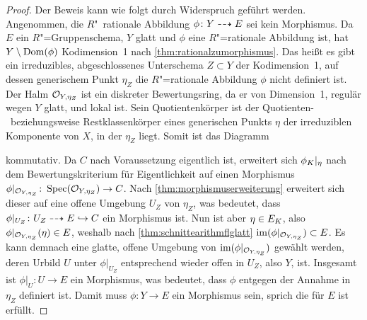 \begin{Satz}
\begin{proof}
    Der Beweis kann wie folgt durch Widerspruch geführt werden.
    Angenommen, die $R$"~ra\-tio\-na\-le Abbildung
    ${\phi\colon Y\dashrightarrow E}$ sei kein Morphismus. 
    Da $E$ ein $R$"=Gruppenschema, $Y$ glatt und $\phi$ eine
    $R$"=rationale Abbildung ist, hat $Y\setminus\operatorname{Dom}(\phi)$
    Kodimension~1 nach \ref{thm:rationalzumorphismus}.
    Das heißt es gibt ein irreduzibles, abgeschlossenes Unterschema
    $Z\subset Y$ der Kodimension~1, auf dessen generischem Punkt
    $\eta_Z$ die $R$"=rationale Abbildung $\phi$ nicht definiert ist.
    Der Halm $\mathcal{O}_{Y,\eta_Z}$ ist ein diskreter Bewertungsring, da er
    von Dimension~1, regulär wegen $Y$ glatt, und lokal ist.
    Sein Quotientenkörper ist der Quotienten-~beziehungsweise
    Restklassenkörper eines generischen Punkts $\eta$ der irreduziblen
    Komponente von $X$, in der $\eta_Z$ liegt. Somit ist das Diagramm
    \begin{center}
    \end{center}
    kommutativ.
    Da $C$ nach Voraussetzung eigentlich ist, erweitert sich
    $\phi_{K}|_{\eta}$ nach dem Bewertungskriterium für
    Eigentlichkeit auf einen Morphismus
    ${\phi|_{\mathcal{O}_{Y,\eta_Z}}\colon\operatorname{Spec}(\mathcal{O}_{Y,\eta_Z})\to C}$.
    Nach \ref{thm:morphismuserweiterung} erweitert sich
    dieser auf eine offene Umgebung $U_Z$ von $\eta_Z$,
    was bedeutet, dass ${\phi|_{U_Z}\colon U_Z\dashrightarrow E\hookrightarrow C}$
    ein Morphismus ist.
    Nun ist aber ${\eta\in E_{K}}$, also
    ${\phi|_{\mathcal{O}_{Y,\eta_Z}}(\eta)\in E}$, weshalb nach
    \ref{thm:schnittearithmflglatt}
    ${\operatorname{im}(\phi|_{\mathcal{O}_{Y,\eta_Z}})\subset E}$.
    Es kann demnach eine glatte, offene Umgebung von
    $\operatorname{im}(\phi|_{\mathcal{O}_{Y,\eta_Z}})$ gewählt werden, deren Urbild $U$ unter
    $\phi|_{U_Z}$ entsprechend wieder offen in $U_Z$, also $Y$, ist.
    Insgesamt ist ${\phi|_U\colon U\to E}$ ein Morphismus, was
    bedeutet, dass $\phi$ entgegen der Annahme in $\eta_Z$ definiert
    ist.
    Damit muss ${\phi\colon Y\to E}$ ein Morphismus sein, sprich die
    \NAbbEig für $E$ ist erfüllt.
    

\end{proof}
\end{Satz}
